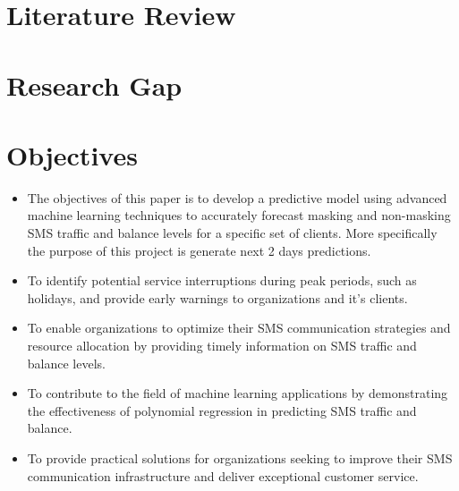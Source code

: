 \documentclass[12pt]{book} %
\begin{document}
\section{Literature Review}



\section{Research Gap}
\section{Objectives}

\begin{itemize}

    \item The objectives of this paper is to develop a predictive model using advanced machine learning techniques to accurately forecast masking and non-masking SMS traffic and balance levels for a specific set of clients. More specifically the purpose of this project is generate next 2 days predictions.
    \item To identify potential service interruptions during peak periods, such as holidays, and provide early warnings to organizations and it's clients.
    \item To enable organizations to optimize their SMS communication strategies and resource allocation by providing timely information on SMS traffic and balance levels.
    \item To contribute to the field of machine learning applications by demonstrating the effectiveness of polynomial regression in predicting SMS traffic and balance.
    \item To provide practical solutions for organizations seeking to improve their SMS communication infrastructure and deliver exceptional customer service.
\end{itemize}






\end{document}
